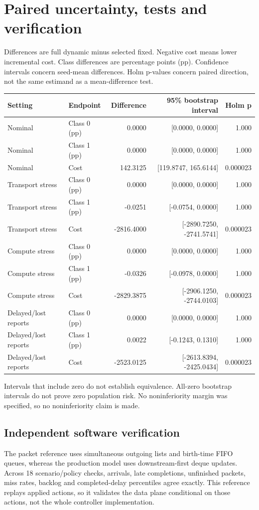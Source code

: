 \documentclass[10pt,a4paper]{article}
\newcommand{\page}[1]{\clearpage\section{#1}}
\begin{document}
\page{Paired uncertainty, tests and verification}
Differences are full dynamic minus selected fixed. Negative cost means lower
incremental cost. Class differences are percentage points (pp). Confidence
intervals concern seed-mean differences. Holm p-values concern paired direction,
not the same estimand as a mean-difference test.
\begin{center}\scriptsize
\begin{tabular}{llrrr}\toprule
Setting & Endpoint & Difference & 95\% bootstrap interval & Holm p\\\midrule
Nominal & Class 0 (pp) & 0.0000 & [0.0000, 0.0000] & 1.000 \\
Nominal & Class 1 (pp) & 0.0000 & [0.0000, 0.0000] & 1.000 \\
Nominal & Cost & 142.3125 & [119.8747, 165.6144] & 0.000023 \\
Transport stress & Class 0 (pp) & 0.0000 & [0.0000, 0.0000] & 1.000 \\
Transport stress & Class 1 (pp) & -0.0251 & [-0.0754, 0.0000] & 1.000 \\
Transport stress & Cost & -2816.4000 & [-2890.7250, -2741.5741] & 0.000023 \\
Compute stress & Class 0 (pp) & 0.0000 & [0.0000, 0.0000] & 1.000 \\
Compute stress & Class 1 (pp) & -0.0326 & [-0.0978, 0.0000] & 1.000 \\
Compute stress & Cost & -2829.3875 & [-2906.1250, -2744.0103] & 0.000023 \\
Delayed/lost reports & Class 0 (pp) & 0.0000 & [0.0000, 0.0000] & 1.000 \\
Delayed/lost reports & Class 1 (pp) & 0.0022 & [-0.1243, 0.1310] & 1.000 \\
Delayed/lost reports & Cost & -2523.0125 & [-2613.8394, -2425.0434] & 0.000023 \\
\bottomrule\end{tabular}\end{center}
Intervals that include zero do not establish equivalence. All-zero bootstrap
intervals do not prove zero population risk. No noninferiority margin was
specified, so no noninferiority claim is made.

\subsection*{Independent software verification}
The packet reference uses simultaneous outgoing lists and birth-time FIFO queues,
whereas the production model uses downstream-first deque updates. Across 18
scenario/policy checks, arrivals, late completions, unfinished packets, miss
rates, backlog and completed-delay percentiles agree exactly. This reference
replays applied actions, so it validates the data plane conditional on those
actions, not the whole controller implementation.
\end{document}
